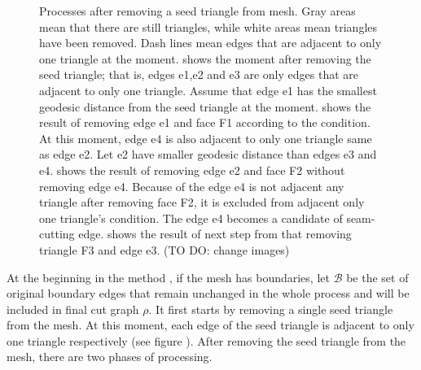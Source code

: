 \documentclass[a4paper,twoside]{article}
\begin{document}
\begin{figure}[t]
	\hspace{0.000\columnwidth}
	\caption{Processes after removing a seed triangle from mesh. Gray areas mean that there are still triangles, while white areas mean triangles have been removed. Dash lines mean edges that are adjacent to only one triangle at the moment.  shows the moment after removing the seed triangle; that is, edges e1,e2 and e3 are only edges that are adjacent to only one triangle. Assume that edge e1 has the smallest geodesic distance from the seed triangle at the moment.  shows the result of removing edge e1 and face F1 according to the condition. At this moment, edge e4 is also adjacent to only one triangle same as edge e2. Let e2 have smaller geodesic distance than edges e3 and e4.   shows the result of removing edge e2 and face F2 without removing edge e4. Because of the edge e4 is not adjacent any triangle after removing face F2, it is excluded from adjacent only one triangle's condition. The edge e4 becomes a candidate of seam-cutting edge.  shows the result of next step from  that removing triangle F3 and edge e3. (TO DO: change images)}
	\label{fig:OriginalGenusReduceMethodStepByStep}
\end{figure}

At the beginning in the method , if the mesh has boundaries, let $\mathscr{B}$  be the set of original boundary edges that remain unchanged in the whole process and will be included in final cut graph ${\rho}$. It first starts by removing a single seed triangle from the mesh. At this moment, each edge of the seed triangle is adjacent to only one triangle respectively (see figure ).  After removing the seed triangle from the mesh, there are two phases of processing.
\end{document}

